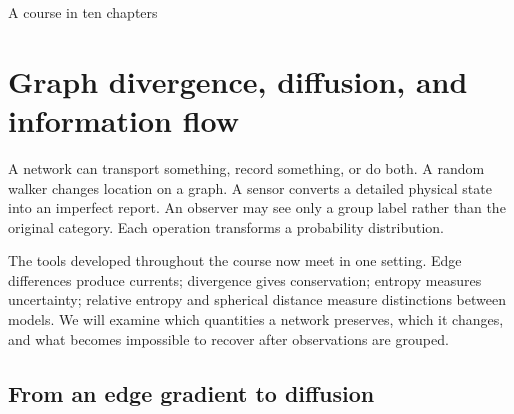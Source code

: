 \documentclass[11pt,oneside,openany]{book}
\theoremstyle{definition}
\theoremstyle{remark}
\numberwithin{equation}{chapter}
\begin{document}
\begin{titlepage}\color{ink}\centering\vspace*{1.0in}{\small\sffamily PROBABILITY AND MATHEMATICAL MODELLING\par}\vspace{.45in}{\Huge\bfseries Discrete Information\\[.12in]Geometry\par}\vspace{.35in}{\Large Finite Differences, Probability,\\and Information Flows\par}\vspace{1cm}{\Large Chapter 10\par}\vfill{}\vfill{\large A course in ten chapters\par}\end{titlepage}
\setcounter{chapter}{9}

\chapter{Graph divergence, diffusion, and information flow}
A network can transport something, record something, or do both. A random walker changes location on a graph. A sensor converts a detailed physical state into an imperfect report. An observer may see only a group label rather than the original category. Each operation transforms a probability distribution.

The tools developed throughout the course now meet in one setting. Edge differences produce currents; divergence gives conservation; entropy measures uncertainty; relative entropy and spherical distance measure distinctions between models. We will examine which quantities a network preserves, which it changes, and what becomes impossible to recover after observations are grouped.

\section{From an edge gradient to diffusion}\label{ch10-from-an-edge-gradient-to-diffusion}
\end{document}
